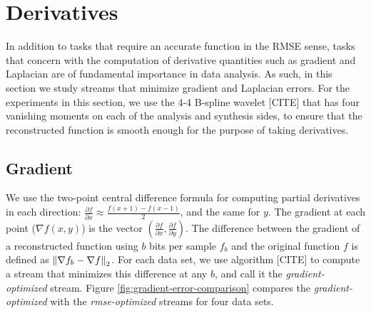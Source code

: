 \section{Derivatives}

In addition to tasks that require an accurate function in the RMSE sense, tasks that concern with
the computation of derivative quantities such as gradient and Laplacian are of fundamental
importance in data analysis. As such, in this section we study streams that minimize gradient and
Laplacian errors. For the experiments in this section, we use the 4-4 B-spline wavelet [CITE] that
has four vanishing moments on each of the analysis and synthesis sides, to ensure that the
reconstructed function is smooth enough for the purpose of taking derivatives.

\subsection{Gradient}

We use the two-point central difference formula for computing partial derivatives in each
direction: $\frac{\partial f}{\partial x}\approx \frac{f(x+1)-f(x-1)}{2}$, and the same for $y$. The
gradient at each point ($\nabla f(x,y)$) is the vector $(\frac{\partial f}{\partial
x},\frac{\partial f}{\partial y})$. The difference between the gradient of a reconstructed function
using $b$ bits per sample $f_b$ and the original function $f$ is defined as $\left\lVert\nabla f_b-\nabla
f\right\rVert_2$. For each data set, we use algorithm [CITE] to compute a stream that minimizes this difference
at any $b$, and call it the \emph{gradient-optimized} stream. Figure
\ref{fig:gradient-error-comparison} compares the \emph{gradient-optimized} with the
\emph{rmse-optimized} streams for four data sets.

